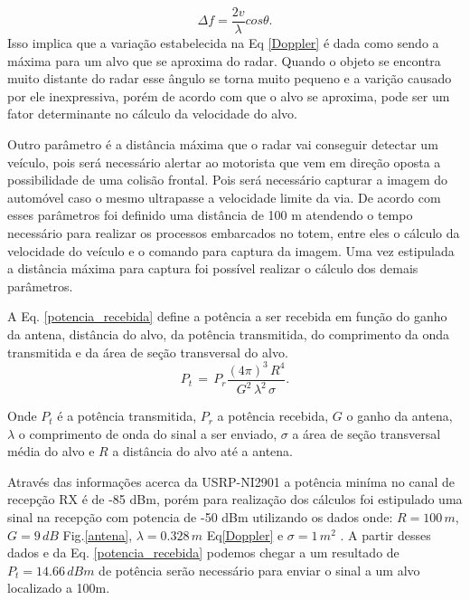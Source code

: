  \begin{equation}\label{Doppler2} 
  \Delta f =  \frac{2v}{\lambda}cos \theta.
\end{equation}
Isso implica que a variação estabelecida na Eq \ref{Doppler} é dada como sendo a máxima para um alvo que se aproxima do radar. Quando o objeto se encontra muito distante do radar esse ângulo se torna muito pequeno e a varição causado por ele inexpressiva, porém de acordo com que o alvo se aproxima, pode ser um fator determinante no cálculo da velocidade do alvo.

Outro parâmetro é a distância máxima que o radar vai conseguir detectar um veículo, pois será necessário alertar ao motorista que vem em direção oposta a possibilidade de uma colisão frontal. Pois será necessário capturar a imagem do automóvel caso o mesmo ultrapasse a velocidade limite da via. De acordo com esses parâmetros foi definido uma distância de 100 m atendendo o tempo necessário para realizar os processos embarcados no totem, entre eles o cálculo da velocidade do veículo e o comando para captura da imagem. Uma vez estipulada a distância máxima para captura foi possível realizar o cálculo dos demais parâmetros.

A Eq. \ref{potencia_recebida} define a potência a ser recebida em função do ganho da antena, distância do alvo, da potência transmitida, do comprimento da onda transmitida e da área de seção transversal do alvo\cite{Richards}.
\begin{equation}\label{potencia_recebida}
    P_t\, =\,   P_r \frac{(4\pi)^{3}\,  R^{4}}{G^{2}\,   \lambda^{2}\, \sigma }.
\end{equation}%

Onde $P_t$ é a potência transmitida, $P_r$ a potência recebida, $G$ o ganho da antena, $\lambda$ o comprimento de onda do sinal a ser enviado, $\sigma$ a área de seção transversal média do alvo e $R$ a distância do alvo até a antena.

Através das informações acerca da USRP-NI2901 \cite{RDS}  a potência miníma no canal de recepção RX é de -85 dBm, porém para realização dos cálculos foi estipulado uma sinal na recepção com potencia de -50 dBm utilizando os dados onde: $R=100 \, m$, $G=9 \, dB$ Fig.\ref{antena}, $\lambda=0.328 \, m$ Eq\ref{Doppler} e $\sigma=1 \, m^{2}$ \cite{Richards}. A partir desses dados e da Eq. \ref{potencia_recebida} podemos chegar a um resultado de $P_t=14.66 \, dBm$ de potência serão necessário para enviar o sinal a um alvo localizado a 100m.


